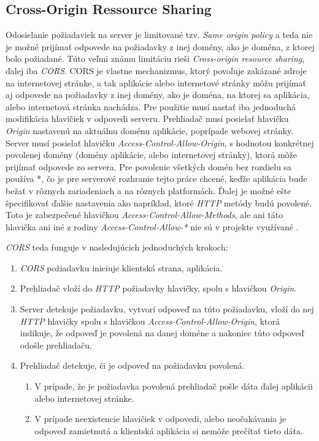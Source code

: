 \subsection{Cross-Origin Ressource Sharing}
Odosielanie požiadaviek na server je limitované tzv. \textit{Same origin policy} a teda nie je možné prijímať odpovede na požiadavky z inej domény, ako je doména, z ktorej bolo požiadané. Túto veľmi známu limitáciu rieši \textit{Cross-origin resource sharing}, ďalej iba \textit{CORS}. CORS je vlastne mechanizmus, ktorý povoľuje zakázané zdroje na internetovej stránke, a tak aplikácie alebo internetové stránky môžu prijímať aj odpovede na požiadavky z inej domény, ako je doména, na ktorej sa aplikácia, alebo internetová stránka nachádza. Pre použitie musí nastať iba jednoduchá modifikácia hlavičiek v odpovedi serveru. Prehliadač musí posielať hlavičku \textit{Origin} nastavenú na aktuálnu doménu aplikácie, poprípade webovej stránky. Server musí posielať hlavičku \textit{Access-Control-Allow-Origin}, s hodnotou konkrétnej povolenej domény (domény aplikácie, alebo internetovej stránky), ktorá môže prijímať odpovede zo servera. Pre povolenie všetkých domén bez rozdielu sa používa *, čo je pre serverové rozhranie tejto práce chcené, keďže aplikácia bude bežať v rôznych zariadeniach a na rôznych platformách. Ďalej je možné ešte špecifikovať ďalšie nastavenia ako napríklad, ktoré \textit{HTTP} metódy budú povolené. Toto je zabezpečené hlavičkou \textit{Access-Control-Allow-Methods}, ale ani táto hlavička ani iné z rodiny \textit{Access-Control-Allow-*} nie sú v projekte využívané \cite{Hossain2015}. 

\textit{CORS} teda funguje v nasledujúcich jednoduchých krokoch:
\begin{enumerate}
\item \textit{CORS} požiadavku iniciuje klientská strana, aplikácia.
\item Prehliadač vloží do \textit{HTTP} požiadavky hlavičky, spolu s hlavičkou \textit{Origin}.
\item Server detekuje požiadavku, vytvorí odpoveď na túto požiadavku, vloží do nej \textit{HTTP} hlavičky spolu s hlavičkou \textit{Access-Control-Allow-Origin}, ktorá indikuje, že odpoveď je povolená na danej doméne a nakoniec túto odpoveď odošle prehliadaču.
\item Prehliadač detekuje, či je odpoveď na požiadavku povolená.
    \begin{enumerate}
    \item V prípade, že je požiadavka povolená prehliadač pošle dáta ďalej aplikácii alebo internetovej stránke.
    \item V prípade neexistencie hlavičiek v odpovedi, alebo neočakávania je odpoveď zamietnutá a klientská aplikácia si nemôže prečítať tieto dáta.
    \end{enumerate}
\end{enumerate}

